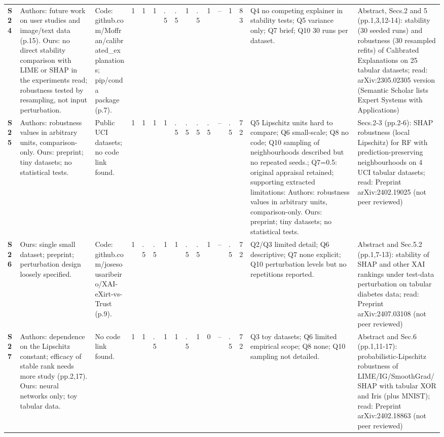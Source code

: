 \begin{longtable}{@{}P{1.0cm}P{4.6cm}P{3.6cm}P{0.3cm}P{0.3cm}P{0.3cm}P{0.3cm}P{0.3cm}P{0.3cm}P{0.3cm}P{0.3cm}P{0.3cm}P{0.36cm}P{0.75cm}P{3.0cm}P{3.9cm}@{}}
\textbf{S24} & Authors: future work on user studies and image/\allowbreak{}text data (p.15). Ours: no direct stability comparison with LIME or SHAP in the experiments read; robustness tested by resampling, not input perturbation. & Code: github.com/\allowbreak{}Moffran/\allowbreak{}calibrated\_\allowbreak{}explanations; pip/\allowbreak{}conda package (p.7). & 1 & 1 & 1 & .5 & .5 & 1 & .5 & 1 & -- & 1 & 83 & Q4 no competing explainer in stability tests; Q5 variance only; Q7 brief; Q10 30 runs per dataset. & Abstract, Secs.2 and 5 (pp.1,3,12-14): stability (30 seeded runs) and robustness (30 resampled refits) of Calibrated Explanations on 25 tabular datasets; read: arXiv:2305.02305 version (Semantic Scholar lists Expert Systems with Applications) \\
\textbf{S25} & Authors: robustness values in arbitrary units, comparison-only. Ours: preprint; tiny datasets; no statistical tests. & Public UCI datasets; no code link found. & 1 & 1 & 1 & 1 & .5 & .5 & .5 & .5 & -- & .5 & 72 & Q5 Lipschitz units hard to compare; Q6 small-scale; Q8 no code; Q10 sampling of neighbourhoods described but no repeated seeds.; Q7=0.5: original appraisal retained; supporting extracted limitations: Authors: robustness values in arbitrary units, comparison-only. Ours: preprint; tiny datasets; no statistical tests. & Secs.2-3 (pp.2-6): SHAP robustness (local Lipschitz) for RF with prediction-preserving neighbourhoods on 4 UCI tabular datasets; read: Preprint arXiv:2402.19025 (not peer reviewed) \\
\textbf{S26} & Ours: single small dataset; preprint; perturbation design loosely specified. & Code: github.com/\allowbreak{}josesousaribeiro/\allowbreak{}XAI-eXirt-vs-Trust (p.9). & 1 & .5 & .5 & 1 & 1 & .5 & .5 & 1 & -- & .5 & 72 & Q2/\allowbreak{}Q3 limited detail; Q6 descriptive; Q7 none explicit; Q10 perturbation levels but no repetitions reported. & Abstract and Sec.5.2 (pp.1,7-13): stability of SHAP and other XAI rankings under test-data perturbation on tabular diabetes data; read: Preprint arXiv:2407.03108 (not peer reviewed) \\
\textbf{S27} & Authors: dependence on the Lipschitz constant; efficacy of stable rank needs more study (pp.2,17). Ours: neural networks only; toy tabular data. & No code link found. & 1 & 1 & .5 & 1 & 1 & .5 & 1 & 0 & -- & .5 & 72 & Q3 toy datasets; Q6 limited empirical scope; Q8 none; Q10 sampling not detailed. & Abstract and Sec.6 (pp.1,11-17): probabilistic-Lipschitz robustness of LIME/\allowbreak{}IG/\allowbreak{}SmoothGrad/\allowbreak{}SHAP with tabular XOR and Iris (plus MNIST); read: Preprint arXiv:2402.18863 (not peer reviewed) \\

\end{longtable}
